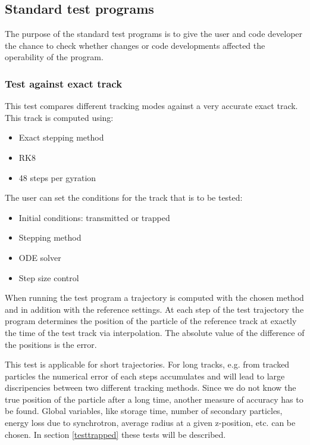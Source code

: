 \subsection{Standard test programs}
The purpose of the standard test programs is to give the user and code developer the chance to check whether changes or code developments affected the operability of the program.  

    \subsubsection*{Test against exact track}
    \label{testcompare}
    This test compares different tracking modes against a very accurate exact track. This track is computed using: 
    \begin{itemize}
        \item Exact stepping method
        \item RK8
        \item 48 steps per gyration
    \end{itemize}
    The user can set the conditions for the track that is to be tested:  
    \begin{itemize}
        \item Initial conditions: transmitted or trapped
        \item Stepping method 
        \item ODE solver
        \item Step size control
    \end{itemize}
    When running the test program a trajectory is computed with the chosen method and in addition with the reference settings. At each step of the test trajectory the program determines the position of the particle of the reference track at exactly the time of the test track via interpolation. The absolute value of the difference of the positions is the error.
    
    This test is applicable for short trajectories. For long tracks, e.g. from tracked particles the numerical error of each steps accumulates and will lead to large discripencies between two different tracking methods. Since we do not know the true position of the particle after a long time, another measure of accuracy has to be found. Global variables, like storage time, number of secondary particles, energy loss due to synchrotron, average radius at a given z-position, etc. can be chosen. In section \ref{testtrapped} these tests will be described.
        
